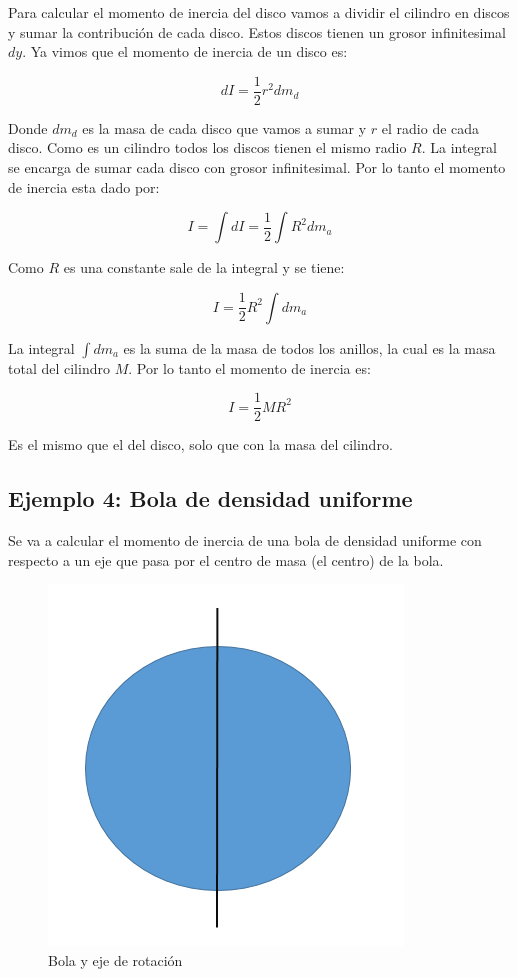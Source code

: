\documentclass[a4paper,11pt]{article}
\begin{document}
\vspace{0.5cm}

Para calcular el momento de inercia del disco vamos a dividir el cilindro en discos y sumar la contribución de cada disco. Estos discos tienen un grosor infinitesimal $dy$. Ya vimos que el momento de inercia de un disco es:

$$ dI = \frac{1}{2} r^2 dm_d $$

Donde $dm_d$ es la masa de cada disco que vamos a sumar y $r$ el radio de cada disco. Como es un cilindro todos los discos tienen el mismo radio $R$. La integral se encarga de sumar cada disco con grosor infinitesimal. Por lo tanto el momento de inercia esta dado por:

$$ I = \int d I  = \frac{1}{2} \int R^2 dm_a $$

Como $R$ es una constante sale de la integral y se tiene:

$$ I = \frac{1}{2} R^2 \int dm_a$$

La integral $\int dm_a$ es la suma de la masa de todos los anillos, la cual es la masa total del cilindro $M$. Por lo tanto el momento de inercia es:

$$ I = \frac{1}{2} M R^2$$

Es el mismo que el del disco, solo que con la masa del cilindro. 

\subsection{Ejemplo 4: Bola de densidad uniforme}

Se va a calcular el momento de inercia de una bola de densidad uniforme con respecto a un eje que pasa por el centro de masa (el centro) de la bola.

\vspace{0.4cm}

\begin{figure}[H]
	\centering
	\includegraphics[width=0.5\linewidth]{./im/bola1}
	\caption{Bola y eje de rotación}
\end{figure}
\end{document}
